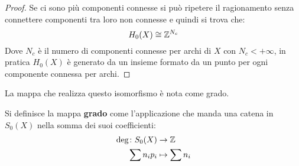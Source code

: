 \begin{proof}
  Se ci sono più componenti connesse si può ripetere il ragionamento senza connettere
  componenti tra loro non connesse e quindi si trova che:
  \[
    H_0(X) \cong \mathbb{Z}^{N_c}
  \]
  Dove $ N_c $ è il numero di componenti connesse per archi di $ X $ con
  $ N_c < + \infty $, in pratica $ H_0(X) $ è generato da un insieme formato da un
  punto per ogni componente connessa per archi.
\end{proof}
\eproof
La mappa che realizza questo isomorfismo è nota come grado.
\begin{definition}
  Si definisce la mappa \textbf{grado}  come l'applicazione che manda una catena in $ S_0(X) $ nella somma
  dei suoi coefficienti:
  \begin{align*}
    \deg \colon S_0(X)    & \to  \mathbb{Z} \\
    \sum n_i p_i & \mapsto  \sum n_i
  \end{align*}
\end{definition}

